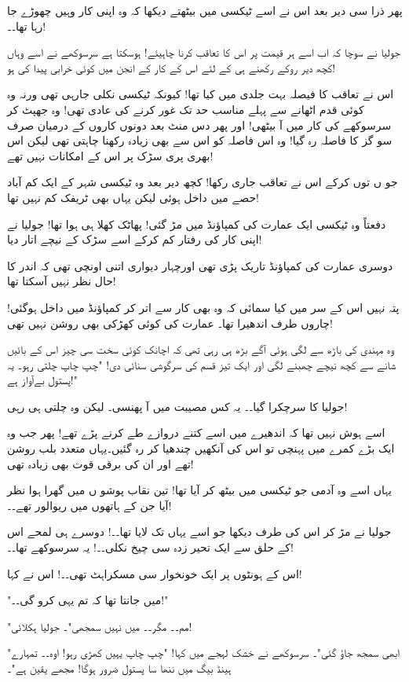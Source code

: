 پھر ذرا سی دیر بعد اس نے اسے ٹیکسی میں بیٹھتے دیکھا کہ وہ اپنی کار وہیں چھوڑے جا رہا تھا۔۔!

جولیا نے سوچا کہ اب اسے ہر قیمت پر اس کا تعاقب کرنا چاہیئے! ہوسکتا ہے سرسوکھے نے اسے وہاں کچھ دیر روکے رکھنے ہی کے لئے اس کے کار کے انجن میں کوئی خرابی پیدا کی ہو!

اس نے تعاقب کا فیصلہ بہت جلدی میں کیا تھا! کیونکہ ٹیکسی نکلی جارہی تھی ورنہ وہ کوئی قدم اٹھانے سے پہلے مناسب حد تک غور کرنے کی عادی تھی! وہ جھپٹ کر سرسوکھے کی کار میں آ بیٹھی! اور پھر دس منٹ بعد دونوں کاروں کے درمیان صرف سو گز کا فاصلہ رہ گیا! وہ اس فاصلہ کو اس سے بھی زیادہ رکھنا چاہتی تھی لیکن اس بھری پری سڑک پر اس کے امکانات نہیں تھے!

جو ں توں کرکے اس نے تعاقب جاری رکھا! کچھ دیر بعد وہ ٹیکسی شہر کے ایک کم آباد حصے میں داخل ہوئی لیکن یہاں بھی ٹریفک کم نہیں تھا!

دفعتاً وہ ٹیکسی ایک عمارت کی کمپاؤنڈ میں مڑ گئی! پھاٹک کھلا ہی ہوا تھا! جولیا نے اپنی کار کی رفتار کم کرکے اسے سڑک کے نیچے اتار دیا!

دوسری عمارت کی کمپاؤنڈ تاریک پڑی تھی اورچہار دیواری اتنی اونچی تھی کہ اندر کا حال نظر نہیں آسکتا تھا!

پتہ نہیں اس کے سر میں کیا سمائی کہ وہ بھی کار سے اتر کر کمپاؤنڈ میں داخل ہوگئی! چاروں طرف اندھیرا تھا۔ عمارت کی کوئی کھڑکی بھی روشن نہیں تھی!

وہ مہندی کی باڑھ سے لگی ہوئی آگے بڑھ ہی رہی تھی کہ اچانک کوئی سخت سی چیز اس کے بائیں شانے سے کچھ نیچے چھبنے لگی اور ایک تیز قسم کی سرگوشی سنائی دی! "چپ چاپ چلتی رہو۔ یہ پستول بےآواز ہے!"

جولیا کا سرچکرا گیا۔۔ یہ کس مصیبت میں آ پھنسی۔ لیکن وہ چلتی ہی رہی!

اسے ہوش نہیں تھا کہ اندھیرے میں اسے کتنے دروازے طے کرنے پڑے تھے! پھر جب وہ ایک بڑے کمرے میں پہنچی تو اس کی آنکھیں چندھیا کر رہ گئیں۔یہاں متعدد بلب روشن تھے اور ان کی برقی قوت بھی زیادہ تھی!

یہاں اسے وہ آدمی جو ٹیکسی میں بیٹھ کر آیا تھا! تین نقاب پوشو ں میں گھرا ہوا نظر آیا جن کے ہاتھوں میں ریوالور تھے۔۔!

جولیا نے مڑ کر اس کی طرف دیکھا جو اسے یہاں تک لایا تھا۔۔! دوسرے ہی لمحے اس کے حلق سے ایک تحیر زدہ سی چیخ نکلی۔۔! 
یہ سرسوکھے تھا۔۔!

اس کے ہونٹوں پر ایک خونخوار سی مسکراہٹ تھی۔۔! اس نے کہا!

"میں جانتا تھا کہ تم یہی کرو گی۔۔!"

"مم۔۔ مگر۔۔ میں نہیں سمجھی"۔ جولیا ہکلائی!

"ابھی سمجھ جاؤ گئی"۔ سرسوکھے نے خشک لہجے میں کہا! "چپ چاپ یہیں کھڑی رہو! اوہ۔۔ تمہارے ہینڈ بیگ میں ننھا سا پستول ضرور ہوگا! مجھے یقین ہے"۔

